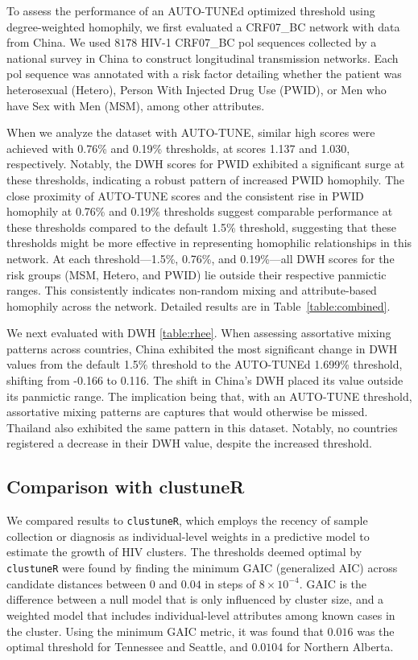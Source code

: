 \documentclass[utf8]{FrontiersinHarvard} %
\begin{document}
To assess the performance of an AUTO-TUNEd optimized threshold using
degree-weighted homophily, we first evaluated a CRF07\_BC network with data
from China. We used $8178$ HIV-1 CRF07\_BC pol sequences collected by a
national survey in China to construct longitudinal transmission networks. Each
pol sequence was annotated with a risk factor detailing whether the patient was
heterosexual (Hetero), Person With Injected Drug Use (PWID), or Men who have
Sex with Men (MSM), among other attributes.

When we analyze the dataset with AUTO-TUNE, similar high scores were achieved
with 0.76\% and 0.19\% thresholds, at scores 1.137 and 1.030, respectively.
Notably, the DWH scores for PWID exhibited a significant surge at these
thresholds, indicating a robust pattern of increased PWID homophily. The close
proximity of AUTO-TUNE scores and the consistent rise in PWID homophily at
0.76\% and 0.19\% thresholds suggest comparable performance at these thresholds
compared to the default 1.5\% threshold, suggesting that these thresholds might
be more effective in representing homophilic relationships in this network. At
each threshold—1.5\%, 0.76\%, and 0.19\%—all DWH scores for the risk groups
(MSM, Hetero, and PWID) lie outside their respective panmictic ranges. This
consistently indicates non-random mixing and attribute-based homophily across
the network. Detailed results are in Table~\ref{table:combined}.

We next evaluated \citep{rhee_national_2019} with DWH \ref{table:rhee}. When
assessing assortative mixing patterns across countries, China exhibited the
most significant change in DWH values from the default 1.5\% threshold to the
AUTO-TUNEd 1.699\% threshold, shifting from -0.166 to 0.116. The shift in
China's DWH placed its value outside its panmictic range. The implication being
that, with an AUTO-TUNE threshold, assortative mixing patterns are captures
that would otherwise be missed. Thailand also exhibited the same pattern in
this dataset. Notably, no countries registered a decrease in their DWH value,
despite the increased threshold. \label{fig:scoreAbove2}

\subsection{Comparison with clustuneR}

We compared results to {\tt clustuneR}, which employs the recency of sample
collection or diagnosis as individual-level weights in a predictive model to
estimate the growth of HIV clusters. The thresholds deemed optimal by {\tt
		clustuneR} were found by finding the minimum GAIC (generalized AIC) across
candidate distances between $0$ and $0.04$ in steps of $8 \times 10^{-4}$. GAIC
is the difference between a null model that is only influenced by cluster size,
and a weighted model that includes individual-level attributes among known
cases in the cluster. Using the minimum GAIC metric, it was found that $0.016$
was the optimal threshold for Tennessee and Seattle, and $0.0104$ for Northern
Alberta.
\end{document}
